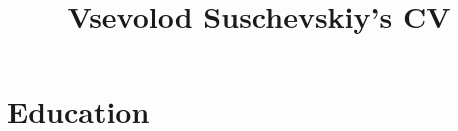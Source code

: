 \documentclass[a4paper, extended]{adcv}
\title{Vsevolod Suschevskiy's CV}
\begin{document}






\section{Education}
\end{document}
